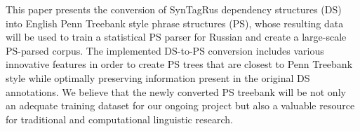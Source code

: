 This paper presents the conversion of SynTagRus dependency structures (DS) into English Penn Treebank style phrase structures (PS), whose resulting data will be used to train a statistical PS parser for Russian and create a large-scale PS-parsed corpus. The implemented DS-to-PS conversion includes various innovative features in order to create PS trees that are closest to Penn Treebank style while optimally preserving information present in the original DS annotations. We believe that the newly converted PS treebank will be not only an adequate training dataset for our ongoing project but also a valuable resource for traditional and computational linguistic research.
